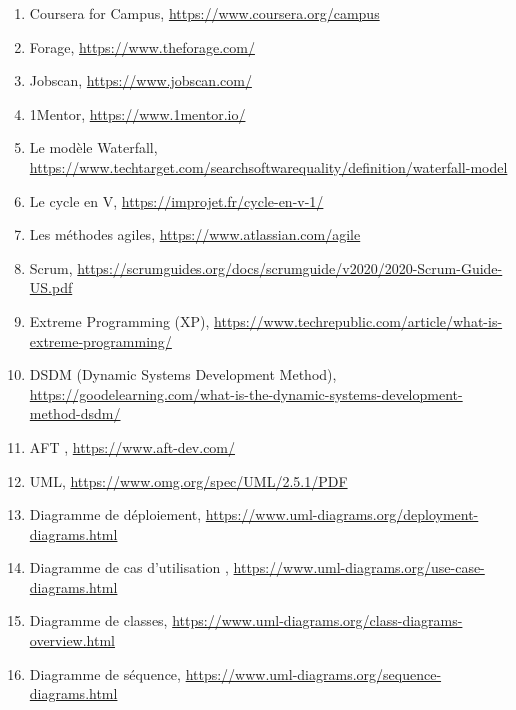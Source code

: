 \documentclass[12pt,a4paper]{report}
\begin{document}
\begin{enumerate}
  \item Coursera for Campus, \url{https://www.coursera.org/campus}

  \item Forage, \url{https://www.theforage.com/}

  \item Jobscan, \url{https://www.jobscan.com/}

  \item 1Mentor, \url{https://www.1mentor.io/}

  \item Le modèle Waterfall, \url{https://www.techtarget.com/searchsoftwarequality/definition/waterfall-model}

  \item Le cycle en V, \url{https://improjet.fr/cycle-en-v-1/}

  \item Les méthodes agiles, \url{https://www.atlassian.com/agile}

  \item Scrum, \url{https://scrumguides.org/docs/scrumguide/v2020/2020-Scrum-Guide-US.pdf}

  \item Extreme Programming (XP), \url{https://www.techrepublic.com/article/what-is-extreme-programming/}

  \item DSDM (Dynamic Systems Development Method), \url{https://goodelearning.com/what-is-the-dynamic-systems-development-method-dsdm/}

  \item AFT , \url{https://www.aft-dev.com/}

  \item UML, \url{https://www.omg.org/spec/UML/2.5.1/PDF}

  \item Diagramme de déploiement, \url{https://www.uml-diagrams.org/deployment-diagrams.html}

  \item Diagramme de cas d'utilisation , \url{https://www.uml-diagrams.org/use-case-diagrams.html}

  \item Diagramme de classes, \url{https://www.uml-diagrams.org/class-diagrams-overview.html}

  \item Diagramme de séquence, \url{https://www.uml-diagrams.org/sequence-diagrams.html}
\end{enumerate}
\end{document}
